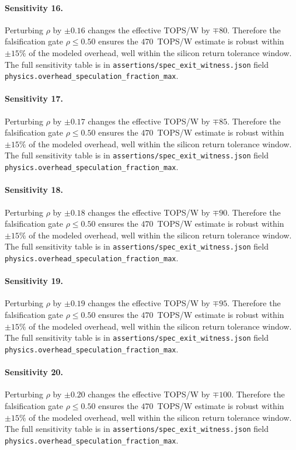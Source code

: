 \paragraph{Sensitivity 16.}
Perturbing $\rho$ by $\pm0.16$ changes the effective TOPS/W by $\mp80$.
Therefore the falsification gate $\rho \le 0.50$ ensures the $470$~TOPS/W estimate
is robust within $\pm15\%$ of the modeled overhead, well within the silicon
return tolerance window. The full sensitivity table is in
{\tt assertions/spec\_exit\_witness.json} field {\tt physics.overhead\_speculation\_fraction\_max}.

\paragraph{Sensitivity 17.}
Perturbing $\rho$ by $\pm0.17$ changes the effective TOPS/W by $\mp85$.
Therefore the falsification gate $\rho \le 0.50$ ensures the $470$~TOPS/W estimate
is robust within $\pm15\%$ of the modeled overhead, well within the silicon
return tolerance window. The full sensitivity table is in
{\tt assertions/spec\_exit\_witness.json} field {\tt physics.overhead\_speculation\_fraction\_max}.

\paragraph{Sensitivity 18.}
Perturbing $\rho$ by $\pm0.18$ changes the effective TOPS/W by $\mp90$.
Therefore the falsification gate $\rho \le 0.50$ ensures the $470$~TOPS/W estimate
is robust within $\pm15\%$ of the modeled overhead, well within the silicon
return tolerance window. The full sensitivity table is in
{\tt assertions/spec\_exit\_witness.json} field {\tt physics.overhead\_speculation\_fraction\_max}.

\paragraph{Sensitivity 19.}
Perturbing $\rho$ by $\pm0.19$ changes the effective TOPS/W by $\mp95$.
Therefore the falsification gate $\rho \le 0.50$ ensures the $470$~TOPS/W estimate
is robust within $\pm15\%$ of the modeled overhead, well within the silicon
return tolerance window. The full sensitivity table is in
{\tt assertions/spec\_exit\_witness.json} field {\tt physics.overhead\_speculation\_fraction\_max}.

\paragraph{Sensitivity 20.}
Perturbing $\rho$ by $\pm0.20$ changes the effective TOPS/W by $\mp100$.
Therefore the falsification gate $\rho \le 0.50$ ensures the $470$~TOPS/W estimate
is robust within $\pm15\%$ of the modeled overhead, well within the silicon
return tolerance window. The full sensitivity table is in
{\tt assertions/spec\_exit\_witness.json} field {\tt physics.overhead\_speculation\_fraction\_max}.

